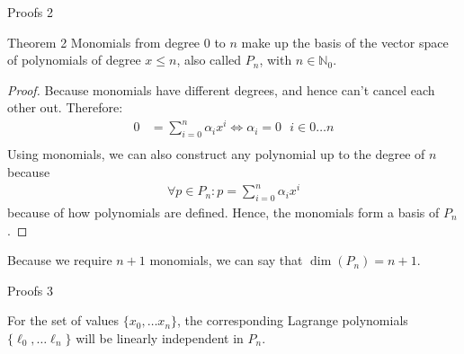 \documentclass[8pt]{beamer}
\begin{document}
			\begin{frame}{Proofs 2}
				\begin{block}{Theorem 2}
					Monomials from degree $0$ to $n$ make up the basis of the vector space of polynomials of degree $x \leq n$, also called $P_n$, with $n \in \mathbb{N}_0$.
				\end{block}
				\begin{proof}
					Because monomials have different degrees, and hence can't cancel each other out. Therefore: 
					\begin{align*}
						0 &= \sum_{i=0}^{n}\alpha_i x^i \Leftrightarrow \alpha_i = 0 \text{   } i \in 0 \ldots n \\
					\end{align*}
					Using monomials, we can also construct any polynomial up to the degree of $n$ because
					\begin{align*}
						\forall p \in P_n : p = \sum_{i=0}^{n}\alpha_i x^i 
					\end{align*}
					because of how polynomials are defined. Hence, the monomials form a basis of $P_n$.
				\end{proof}
				Because we require $n+1$ monomials, we can say that $\dim(P_n) = n+1$.
				\end{frame}
					
					\begin{frame}{Proofs 3}
						\begin{theorem}
							For the set of values $\{x_0, \ldots x_n \}$, the corresponding Lagrange polynomials $\{\ell_0, \ldots \ell_n \}$ will be linearly independent in $P_n$.
						\end{theorem}
						\end{frame}
							
\end{document}
